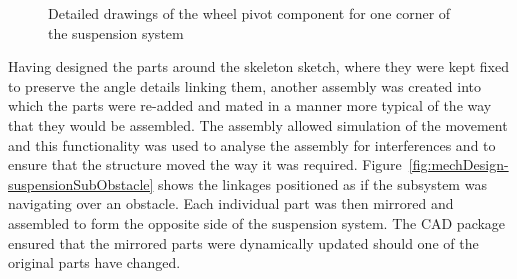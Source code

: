         \begin{figure}[H]
        \centering
        \caption[Detailed drawings of the wheel pivot component for one corner of the suspension system]{Detailed drawings of the wheel pivot component for one corner of the suspension system}
        \label{fig:mechDesign-wheelStrutDetail}
        \end{figure}
          

      Having designed the parts around the skeleton sketch, where they were kept fixed to preserve the angle details linking them, another assembly was created into which the parts were re-added and mated in a manner more typical of the way that they would be assembled. The assembly allowed simulation of the movement and this functionality was used to analyse the assembly for interferences and to ensure that the structure moved the way it was required. Figure~\ref{fig:mechDesign-suspensionSubObstacle} shows the linkages positioned as if the subsystem was navigating over an obstacle. Each individual part was then mirrored and assembled to form the opposite side of the suspension system. The CAD package ensured that the mirrored parts were dynamically updated should one of the original parts have changed.
      
